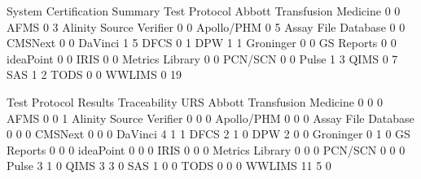 \documentclass{article}
\begin{document}
\begin{Schunk}
\begin{Soutput}
                              System Certification Summary Test Protocol
  Abbott Transfusion Medicine                            0             0
  AFMS                                                   0             3
  Alinity Source Verifier                                0             0
  Apollo/PHM                                             0             5
  Assay File Database                                    0             0
  CMSNext                                                0             0
  DaVinci                                                1             5
  DFCS                                                   0             1
  DPW                                                    1             1
  Groninger                                              0             0
  GS Reports                                             0             0
  ideaPoint                                              0             0
  IRIS                                                   0             0
  Metrics Library                                        0             0
  PCN/SCN                                                0             0
  Pulse                                                  1             3
  QIMS                                                   0             7
  SAS                                                    1             2
  TODS                                                   0             0
  WWLIMS                                                 0            19
                             
                              Test Protocol Results Traceability URS
  Abbott Transfusion Medicine                     0            0   0
  AFMS                                            0            0   1
  Alinity Source Verifier                         0            0   0
  Apollo/PHM                                      0            0   0
  Assay File Database                             0            0   0
  CMSNext                                         0            0   0
  DaVinci                                         4            1   1
  DFCS                                            2            1   0
  DPW                                             2            0   0
  Groninger                                       0            1   0
  GS Reports                                      0            0   0
  ideaPoint                                       0            0   0
  IRIS                                            0            0   0
  Metrics Library                                 0            0   0
  PCN/SCN                                         0            0   0
  Pulse                                           3            1   0
  QIMS                                            3            3   0
  SAS                                             1            0   0
  TODS                                            0            0   0
  WWLIMS                                         11            5   0
                             

\end{Soutput}
\end{Schunk}
\end{document}
